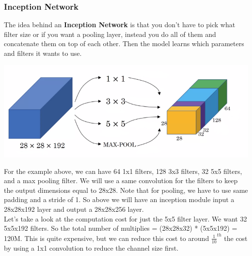 \documentclass[11pt, a4paper]{article}
\begin{document}
\begin{spacing}{1.1}
	\subsubsection{Inception Network}
	The idea behind an \textbf{Inception Network} is that you don't have to pick what filter size or if you want a pooling layer, instead you do all of them and concatenate them on top of each other. Then the model learns which parameters and filters it wants to use.
	\begin{center} \includegraphics[scale=.57]{inception}	\end{center}
	For the example above, we can have 64 1x1 filters, 128 3x3 filters, 32 5x5 filters, and a max pooling filter. We will use a same convolution for the filters to keep the output dimensions equal to 28x28. Note that for pooling, we have to use same padding and a stride of 1. So above we will have an inception module input a 28x28x192 layer and output a 28x28x256 layer. \vspace*{2mm}\\
	Let's take a look at the computation cost for just the 5x5 filter layer. We want 32 5x5x192 filters. So the total number of multiplies = (28x28x32) * (5x5x192) = 120M. This is quite expensive, but we can reduce this cost to around $\frac{1}{10}^{th}$ the cost by using a 1x1 convolution to reduce the channel size first. \newpage


\end{spacing}
\end{document}
